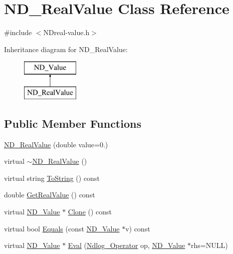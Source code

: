 \hypertarget{class_n_d___real_value}{\section{N\-D\-\_\-\-Real\-Value Class Reference}
\label{class_n_d___real_value}
}


{\ttfamily \#include $<$N\-Dreal-\/value.\-h$>$}

Inheritance diagram for N\-D\-\_\-\-Real\-Value\-:\begin{figure}[H]
\begin{center}
\leavevmode
\includegraphics[height=2.000000cm]{class_n_d___real_value}
\end{center}
\end{figure}
\subsection*{Public Member Functions}
\begin{DoxyCompactItemize}
\item 
\hyperlink{class_n_d___real_value_a62a4030022b7fb095afb7d3cb6d1d2e5}{N\-D\-\_\-\-Real\-Value} (double value=0.)
\item 
virtual \hyperlink{class_n_d___real_value_a59006aa14b6df93f0a1ab3d3082c784f}{$\sim$\-N\-D\-\_\-\-Real\-Value} ()
\item 
virtual string \hyperlink{class_n_d___real_value_ac6103005ec7fa351ff61a2959dcf06b2}{To\-String} () const 
\item 
double \hyperlink{class_n_d___real_value_a722ea3e89683dc713c49804ae27dd38b}{Get\-Real\-Value} () const 
\item 
virtual \hyperlink{class_n_d___value}{N\-D\-\_\-\-Value} $\ast$ \hyperlink{class_n_d___real_value_abc7419df3508e45041a90b981e214956}{Clone} () const 
\item 
virtual bool \hyperlink{class_n_d___real_value_a1550861f2a4accacc074dfb0dde3b190}{Equals} (const \hyperlink{class_n_d___value}{N\-D\-\_\-\-Value} $\ast$v) const 
\item 
virtual \hyperlink{class_n_d___value}{N\-D\-\_\-\-Value} $\ast$ \hyperlink{class_n_d___real_value_aa75f47beb70ca67811a8a00b65409834}{Eval} (\hyperlink{_n_dvalue_8h_afc938fb729c95de25b4d2eb18640b303}{Ndlog\-\_\-\-Operator} op, \hyperlink{class_n_d___value}{N\-D\-\_\-\-Value} $\ast$rhs=N\-U\-L\-L)
\end{DoxyCompactItemize}
